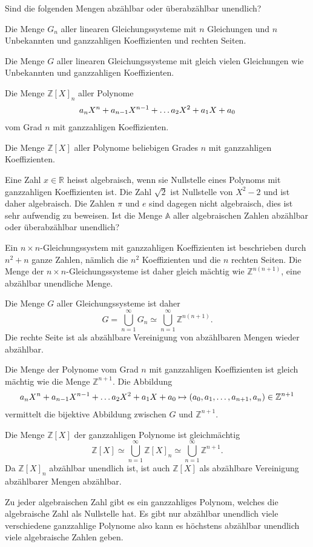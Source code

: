 Sind die folgenden Mengen abzählbar oder überabzählbar unendlich?
\begin{teilaufgaben}
\item
Die Menge $G_n$ aller linearen Gleichungssysteme mit $n$ Gleichungen
und $n$ Unbekannten und ganzzahligen Koeffizienten und rechten Seiten.
\item
Die Menge $G$ aller linearen Gleichungssysteme mit gleich vielen Gleichungen
wie Unbekannten und ganzzahligen Koeffizienten.
\item
Die Menge $\mathbb Z[X]_n$ aller Polynome
\[
a_{\mathstrut n}X^n+a_{n-1}X^{n-1}+\dots a_2X^2+a_1X+a_0
\]
vom Grad $n$ mit ganzzahligen Koeffizienten.
\item
Die Menge $\mathbb Z[X]$ aller Polynome
beliebigen Grades $n$ mit ganzzahligen Koeffizienten.
\item
Eine Zahl $x\in \mathbb R$ heisst algebraisch, wenn sie Nullstelle
eines Polynoms mit ganzzahligen Koeffizienten ist.
Die Zahl $\sqrt{2}$ ist Nullstelle von $X^2-2$ und ist daher algebraisch.
Die Zahlen $\pi$ und $e$ sind dagegen nicht algebraisch, dies ist sehr
aufwendig zu beweisen.
Ist die Menge $\mathbb{A}$ aller algebraischen Zahlen abzählbar oder
überabzählbar unendlich?
\end{teilaufgaben}


\begin{loesung}
\begin{teilaufgaben}
\item
Ein $n\times n$-Gleichungssystem mit ganzzahligen 
Koeffizienten ist beschrieben durch $n^2+n$ ganze Zahlen, nämlich
die $n^2$ Koeffizienten und die $n$ rechten Seiten.
Die Menge der $n\times n$-Gleichungssysteme ist daher gleich
mächtig wie $\mathbb Z^{n(n+1)}$, eine abzählbar unendliche Menge.
\item
Die Menge $G$ aller Gleichungssysteme ist daher 
\[
G = \bigcup_{n=1}^\infty G_n \simeq \bigcup_{n=1}^\infty \mathbb Z^{n(n+1)}.
\]
Die rechte Seite ist als abzählbare Vereinigung von abzählbaren Mengen
wieder abzählbar.
\item
Die Menge der Polynome vom Grad $n$ mit ganzzahligen Koeffizienten
ist gleich mächtig wie die Menge $\mathbb Z^{n+1}$.
Die Abbildung
\[
a_{\mathstrut n}X^n+a_{n-1}X^{n-1}+\dots a_2X^2+a_1X+a_0
\mapsto
(a_0,a_1,\dots,a_{n+1},a_{\mathstrut n}) \in \mathbb{Z}^{n+1}
\]
vermittelt die bijektive Abbildung zwischen $G$ und $\mathbb Z^{n+1}$.
\item
Die Menge $\mathbb Z[X]$ der ganzzahligen Polynome ist gleichmächtig
\[
\mathbb Z[X]
\simeq
\bigcup_{n=1}^\infty \mathbb Z[X]_n
\simeq
\bigcup_{n=1}^\infty \mathbb Z^{n+1}.
\]
Da $\mathbb Z[X]_n$ abzählbar unendlich ist, ist auch $\mathbb Z[X]$
als abzählbare Vereinigung abzählbarer Mengen abzählbar.
\item
Zu jeder algebraischen Zahl gibt es ein ganzzahliges Polynom, welches
die algebraische Zahl als Nullstelle hat.
Es gibt nur abzählbar unendlich viele verschiedene ganzzahlige Polynome
also kann es höchstens abzählbar unendlich viele algebraische Zahlen geben.
\qedhere
\end{teilaufgaben}
\end{loesung}


